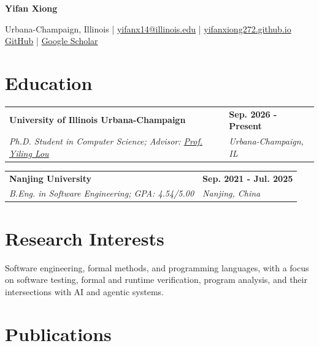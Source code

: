\documentclass[10pt,letterpaper]{article}
\makeatletter
\newcommand{\cventry}[4]{%
  \needspace{3.2\baselineskip}%
  \begin{tabularx}{\textwidth}{@{}X@{\hspace{0.35em}}>{\raggedleft\arraybackslash}p{1.70in}@{}}
    \textbf{#1} & \textbf{#2} \\
    \textit{#3} & \textit{#4}
  \end{tabularx}%
}
\makeatother
\begin{document}
\fontsize{10.5}{12.4}\selectfont

\begin{center}
  {\fontsize{23}{25}\selectfont\bfseries Yifan Xiong}\par
  \vspace{4pt}
  \small
  Urbana-Champaign, Illinois \enspace | \enspace
  \href{mailto:yifanx14@illinois.edu}{yifanx14@illinois.edu} \enspace | \enspace
  \href{https://yifanxiong272.github.io/}{yifanxiong272.github.io}
  \\
  \href{https://github.com/yifanxiong272}{GitHub} \enspace | \enspace
  \href{https://scholar.google.com/citations?hl=en\&user=xyP48YoAAAAJ}{Google Scholar}
\end{center}

\vspace{-0.2em}

\section{Education}

\cventry
  {University of Illinois Urbana-Champaign}
  {Sep. 2026 - Present}
  {Ph.D. Student in Computer Science; Advisor: \href{https://yilinglou.github.io/}{Prof. Yiling Lou}}
  {Urbana-Champaign, IL}

\vspace{0.35em}

\cventry
  {Nanjing University}
  {Sep. 2021 - Jul. 2025}
  {B.Eng. in Software Engineering; GPA: 4.54/5.00}
  {Nanjing, China}

\section{Research Interests}

Software engineering, formal methods, and programming languages, with a focus on software testing, formal and runtime verification, program analysis, and their intersections with AI and agentic systems.

\section{Publications}
\end{document}
